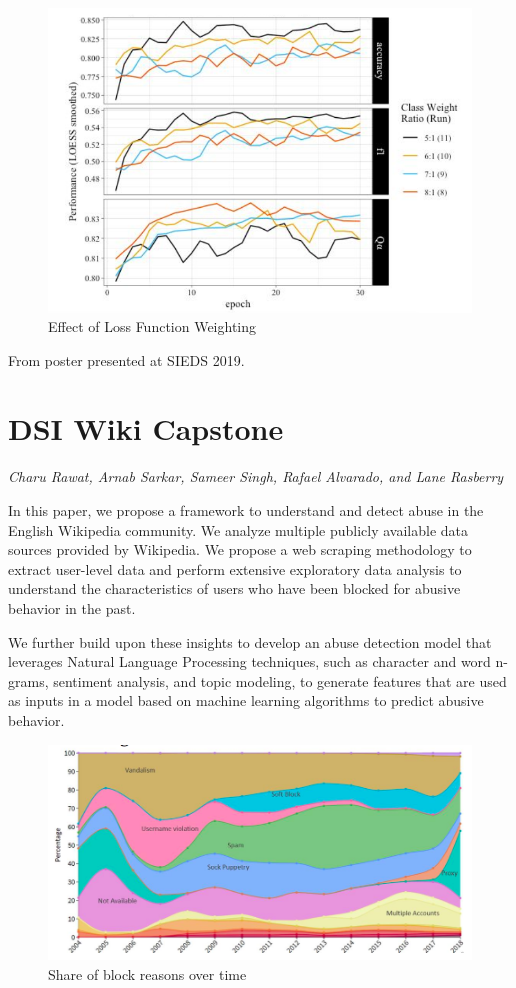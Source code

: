 \begin{figure}[!hbtp]
\includegraphics[width=\textwidth]{images/bmc2}
\caption{Effect of Loss Function Weighting}
\end{figure}



From poster presented at SIEDS 2019.

\pagebreak
\section{DSI Wiki Capstone}
\label{sec:wik}

\emph{Charu Rawat, Arnab Sarkar, Sameer Singh, Rafael Alvarado, and Lane Rasberry}
\bigskip

In this paper, we propose a framework to understand and detect abuse in the English Wikipedia community. We analyze multiple publicly available data sources provided by Wikipedia. We propose a web scraping methodology to extract user-level data and perform extensive exploratory data analysis to understand the characteristics of users who have been blocked for abusive behavior in the past.

We further build upon these insights to develop an abuse detection model that leverages Natural Language Processing techniques, such as character and word n-grams, sentiment analysis, and topic modeling, to generate features that are used as inputs in a model based on machine learning algorithms to predict abusive behavior.

\begin{figure}[!hbtp]
\includegraphics[width=\textwidth]{images/wiki1}
\caption{Share of block reasons over time}
\end{figure}

